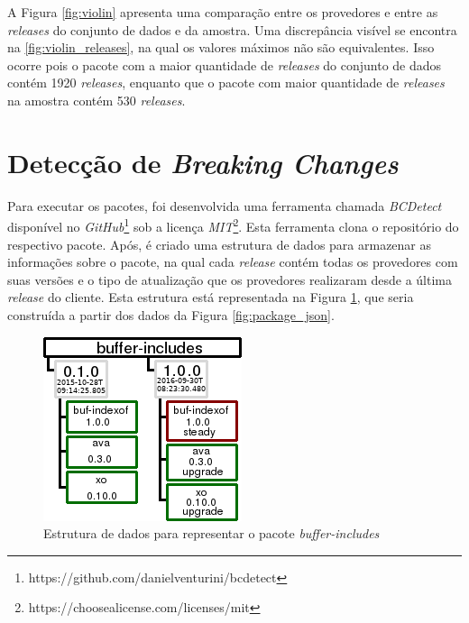 A Figura \ref{fig:violin} apresenta uma comparação entre os provedores e entre as \textit{releases} do conjunto de dados e da amostra. Uma discrepância visível se encontra na \ref{fig:violin_releases}, na qual os valores máximos não são equivalentes. Isso ocorre pois o pacote com a maior quantidade de \textit{releases} do conjunto de dados contém 1920 \textit{releases}, enquanto que o pacote com maior quantidade de \textit{releases} na amostra contém 530 \textit{releases}.

\section{Detecção de \textit{Breaking Changes}}
\label{sec:bcdetect}
Para executar os pacotes, foi desenvolvida uma ferramenta chamada \textit{BCDetect} disponível no \textit{GitHub}\footnote{https://github.com/danielventurini/bcdetect} sob a licença \textit{MIT}\footnote{https://choosealicense.com/licenses/mit}. Esta ferramenta clona o repositório do respectivo pacote. Após, é criado uma estrutura de dados para armazenar as informações sobre o pacote, na qual cada \textit{release} contém todas os provedores com suas versões e o tipo de atualização que os provedores realizaram desde a última \textit{release} do cliente. Esta estrutura está representada na Figura \ref{fig:bc_work}, que seria construída a partir dos dados da Figura \ref{fig:package_json}.

\begin{figure}
    \centering
    \includegraphics[scale=2]{figuras/bcdetect_work.png}
    \caption{Estrutura de dados para representar o pacote \textit{buffer-includes}}
    \label{fig:bc_work}
\end{figure}{}


